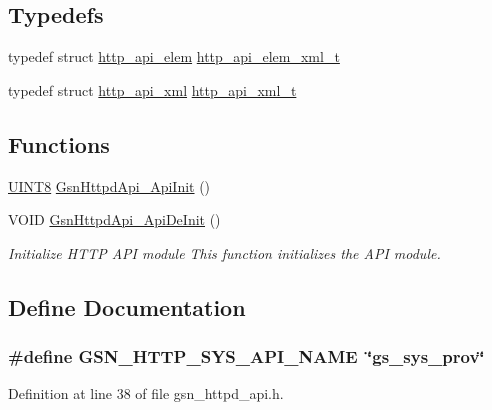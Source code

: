 \subsection*{Typedefs}
\begin{DoxyCompactItemize}
\item 
typedef struct \hyperlink{a00446}{http\_\-api\_\-elem} \hyperlink{a00509_a29e45f72419d101b2c342187ace40347}{http\_\-api\_\-elem\_\-xml\_\-t}
\item 
typedef struct \hyperlink{a00447}{http\_\-api\_\-xml} \hyperlink{a00509_aaa9cd32d917ce1d46d4eb48d93dd8414}{http\_\-api\_\-xml\_\-t}
\end{DoxyCompactItemize}
\subsection*{Functions}
\begin{DoxyCompactItemize}
\item 
\hyperlink{a00660_gab27e9918b538ce9d8ca692479b375b6a}{UINT8} \hyperlink{a00509_a7b6f732588c799bbc3b64b50e4193ffc}{GsnHttpdApi\_\-ApiInit} ()
\item 
VOID \hyperlink{a00509_a6879bddcd5df82d454216c5f406aa68d}{GsnHttpdApi\_\-ApiDeInit} ()
\begin{DoxyCompactList}\small\item\em Initialize HTTP API module This function initializes the API module. \end{DoxyCompactList}\end{DoxyCompactItemize}


\subsection{Define Documentation}
\hypertarget{a00509_a4207c446f2a0505eac2dee1a4136a2b8}{
\subsubsection[{GSN\_\-HTTP\_\-SYS\_\-API\_\-NAME}]{\setlength{\rightskip}{0pt plus 5cm}\#define GSN\_\-HTTP\_\-SYS\_\-API\_\-NAME~\char`\"{}gs\_\-sys\_\-prov\char`\"{}}}
\label{a00509_a4207c446f2a0505eac2dee1a4136a2b8}


Definition at line 38 of file gsn\_\-httpd\_\-api.h.

